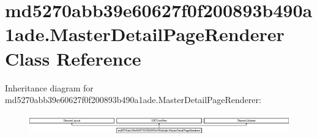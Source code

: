 \hypertarget{classmd5270abb39e60627f0f200893b490a1ade_1_1MasterDetailPageRenderer}{}\section{md5270abb39e60627f0f200893b490a1ade.\+Master\+Detail\+Page\+Renderer Class Reference}
\label{classmd5270abb39e60627f0f200893b490a1ade_1_1MasterDetailPageRenderer}
Inheritance diagram for md5270abb39e60627f0f200893b490a1ade.\+Master\+Detail\+Page\+Renderer\+:\begin{figure}[H]
\begin{center}
\leavevmode
\includegraphics[height=0.893142cm]{classmd5270abb39e60627f0f200893b490a1ade_1_1MasterDetailPageRenderer}
\end{center}
\end{figure}
